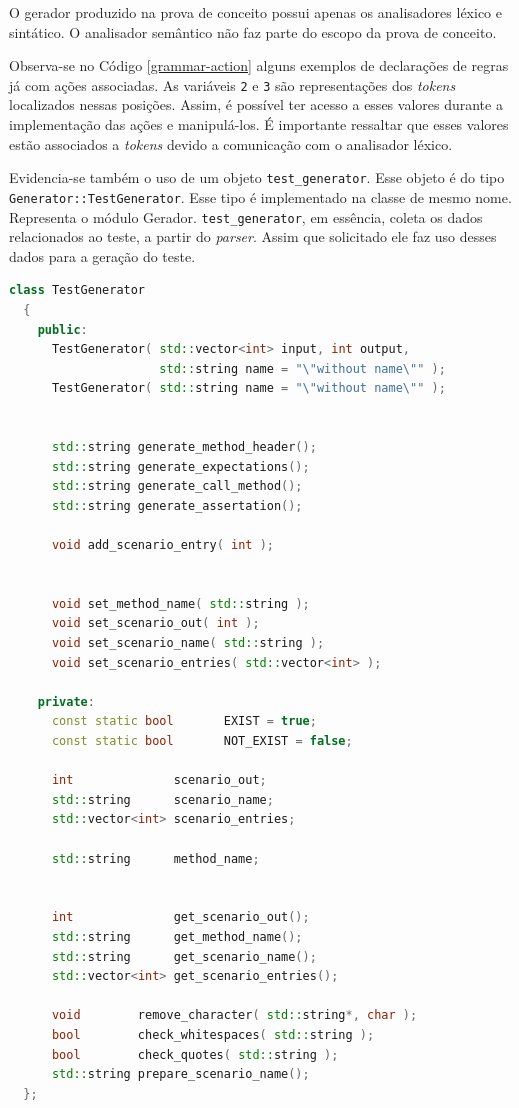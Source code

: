 \par
\indent O gerador produzido na prova de conceito possui apenas os analisadores léxico e sintático. O analisador semântico não faz parte do escopo da prova de conceito.
\par
\indent Observa-se no Código \ref{grammar-action} alguns exemplos de declarações de regras já com ações associadas. As variáveis \textdollar\lstinline|2| e \textdollar\lstinline|3| são representações dos \textit{tokens} localizados nessas posições. Assim, é possível ter acesso a esses valores durante a implementação das ações e manipulá-los. É importante ressaltar que esses valores estão associados a \textit{tokens} devido a comunicação com o analisador léxico.
\par
\indent Evidencia-se também o uso de um objeto \lstinline|test_generator|. Esse objeto é do tipo \lstinline|Generator::TestGenerator|. Esse tipo é implementado na classe de mesmo nome. Representa o módulo Gerador. \lstinline|test_generator|, em essência, coleta os dados relacionados ao teste, a partir do \textit{parser}. Assim que solicitado ele faz uso desses dados para a geração do teste.
\begin{lstlisting}[language=C++, label=testgeneratorhpp, caption=Interface (\textit{header}) da classe TestGenerator]
  class TestGenerator
  {
    public:
      TestGenerator( std::vector<int> input, int output,
                     std::string name = "\"without name\"" );
      TestGenerator( std::string name = "\"without name\"" );


      std::string generate_method_header();
      std::string generate_expectations();
      std::string generate_call_method();
      std::string generate_assertation();

      void add_scenario_entry( int );


      void set_method_name( std::string );
      void set_scenario_out( int );
      void set_scenario_name( std::string );
      void set_scenario_entries( std::vector<int> );

    private:
      const static bool       EXIST = true;
      const static bool       NOT_EXIST = false;

      int              scenario_out;
      std::string      scenario_name;
      std::vector<int> scenario_entries;

      std::string      method_name;


      int              get_scenario_out();
      std::string      get_method_name();
      std::string      get_scenario_name();
      std::vector<int> get_scenario_entries();

      void        remove_character( std::string*, char );
      bool        check_whitespaces( std::string );
      bool        check_quotes( std::string );
      std::string prepare_scenario_name();
  };
\end{lstlisting}
